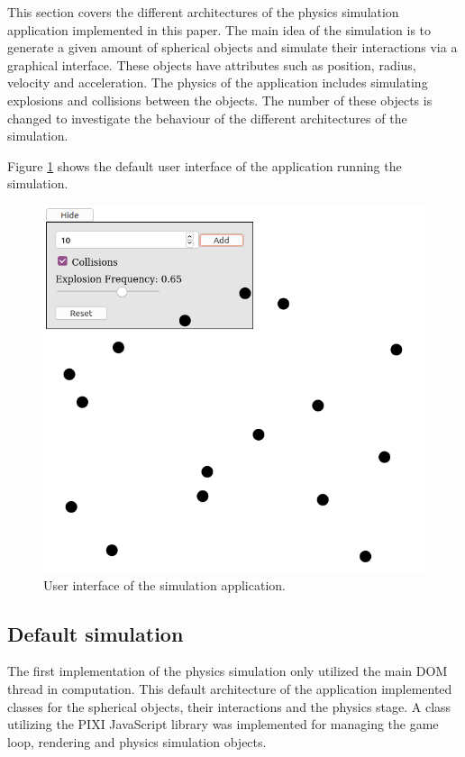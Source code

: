\documentclass[conference]{IEEEtran}
\begin{document}
This section covers the different architectures of the physics simulation application implemented in this paper. The main idea of the simulation is to generate a given amount
of spherical objects and simulate their interactions via a graphical interface. These objects have attributes such as position, radius, velocity and acceleration. The 
physics of the application includes simulating explosions and collisions between the objects. The number of these objects is changed to investigate the behaviour
of the different architectures of the simulation.

Figure \ref{fig:figure2} shows the default user interface of the application running the simulation.

\begin{figure}[ht]
	\centering
	\includegraphics[scale=0.5]{figs/figure2.png}
	\caption{User interface of the simulation application.}
	\label{fig:figure2}
\end{figure}

\subsection{Default simulation} 
\label{sec:default}

The first implementation of the physics simulation only utilized the main DOM thread in computation. This default architecture of the application implemented classes for the
spherical objects, their interactions and the physics stage. A class utilizing the PIXI JavaScript library was implemented for managing the game loop, rendering and
physics simulation objects.
\end{document}
